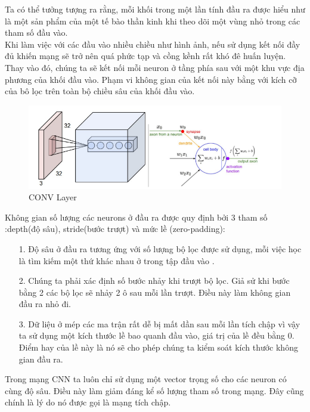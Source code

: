 \documentclass[a4paper,12pt]{report}
\begin{document}
Ta có thể tưởng tượng ra rằng, mỗi khối trong một lần tính đầu ra được hiểu như là một sản phẩm của một tế bào thần kinh khi theo dõi một vùng nhỏ trong các tham số đầu vào. \\ 
 
Khi làm việc với các đầu vào nhiều chiều như hình ảnh, nếu sử dụng kết nối đầy đủ khiến mạng sẽ trở nên quá phức tạp và cồng kềnh rất khó đê huấn luyện. Thay vào đó, chúng ta sẽ kết nối mỗi neuron ở tầng phía sau với một khu vực địa phương của khối đầu vào. Phạm vi không gian của kết nối này bằng với kích cỡ của bô lọc trên toàn bộ chiều sâu của khối đầu vào.

\begin{figure}[H]
\includegraphics[scale=0.7]{img2.png}
\caption{CONV Layer}
\end{figure}
Không gian số lượng các neurons ở đầu ra được quy định bởi 3 tham số :depth(độ sâu), stride(bước trượt) và mức lề (zero-padding):
\begin{itemize}
\item[1. ] Độ sâu ở đầu ra tương ứng với số lượng bộ lọc được sử dụng, mỗi việc học là tìm kiếm một thứ khác nhau ở trong tập đầu vào .
\item[2. ] Chúng ta phải xác định số bước nhảy khi trượt bộ lọc. Giả sử khi bước bằng 2 các bộ lọc sẽ nhảy 2 ô sau mỗi lần trượt. Điều này làm không gian đầu ra nhỏ đi.
\item[3. ] Dữ liệu ở mép các ma trận rất dễ bị mất dần sau mỗi lần tích chập vì vậy ta sử dụng một kích thước lề bao quanh đầu vào, giá trị của lề đều bằng 0. Điểm hay của lề này là nó sẽ cho phép chúng ta kiểm soát kích thước không gian đầu ra.
\end{itemize} 

Trong mạng CNN ta luôn chỉ sử dụng một vector trọng số cho các neuron có cùng độ sâu. Điều này làm giảm đáng kể số lượng tham số trong mạng. Đây cũng chính là lý do nó được gọi là mạng tích chập.\\
 
\end{document}
